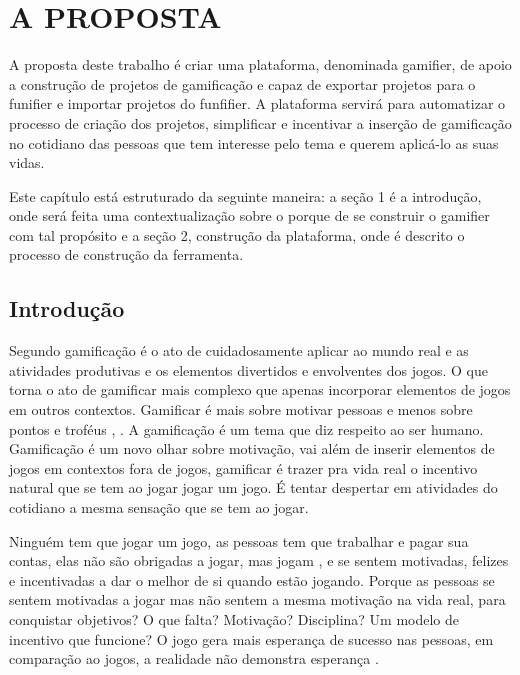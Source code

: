 
\chapter[A Proposta]{A PROPOSTA}

A proposta deste trabalho é criar uma plataforma, denominada gamifier, de apoio a construção de projetos de gamificação e capaz de exportar projetos para o funifier e importar projetos do funfifier. A plataforma servirá para automatizar o processo de criação dos projetos, simplificar e incentivar a inserção de gamificação no cotidiano das pessoas que tem interesse pelo tema e querem aplicá-lo as suas vidas.

 Este capítulo está estruturado da seguinte maneira: a seção 1 é a introdução, onde será feita uma contextualização sobre o porque de se construir o gamifier com tal propósito e a seção 2, construção da plataforma, onde é descrito o processo de construção da ferramenta.           

\section{Introdução}

 

Segundo \cite{chou2015actionable} gamificação é o ato de cuidadosamente aplicar ao mundo real e as atividades produtivas e os elementos divertidos e envolventes dos jogos. O que torna o ato de gamificar mais complexo que apenas incorporar elementos de jogos em outros contextos. Gamificar é mais sobre  motivar pessoas e menos sobre pontos e troféus \cite{chou2015actionable}, \cite{zichermann2011gamification}. A gamificação é um tema que diz respeito ao ser humano. Gamificação é um novo olhar sobre motivação, vai além de inserir elementos de jogos em contextos fora de jogos, gamificar é trazer pra vida real o incentivo natural que se tem ao jogar jogar um jogo.  É tentar despertar em atividades do cotidiano a mesma sensação que se tem ao jogar.

Ninguém tem que jogar um jogo, as pessoas tem que trabalhar e pagar sua contas, elas não são obrigadas a jogar, mas jogam \cite{chou2015actionable},  \cite{mcgonigal2011reality} e se sentem motivadas, felizes e incentivadas a dar o melhor de si quando estão jogando. Porque as pessoas se sentem motivadas a jogar mas não sentem a mesma motivação na vida real, para conquistar objetivos? O que falta? Motivação? Disciplina? Um modelo de incentivo que funcione? O jogo gera mais esperança de sucesso nas pessoas, em comparação ao jogos, a realidade não demonstra esperança \cite{mcgonigal2011reality}.

